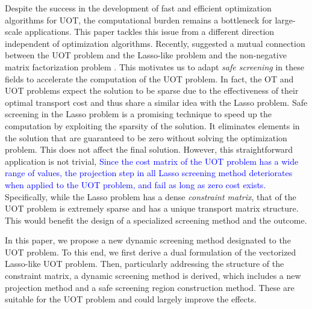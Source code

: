 \documentclass[twoside]{article}
\theoremstyle{plain}
\newcommand{\changeXS}[1]{\textcolor{blue}{#1}}
\begin{document}
Despite the success in the development of fast and efficient optimization algorithms for UOT, the computational burden remains a bottleneck for large-scale applications. This paper tackles this issue from a different direction independent of optimization algorithms. Recently, \cite{Chapel_NeurIPS_2021} suggested a mutual connection between the UOT problem and the Lasso-like problem \citep{Tibshirani_JRSS_1996,Efron_AM_2004} and the non-negative matrix factorization problem \citep{Lee_NIPS_2000}. This motivates us to adapt {\it safe screening} \citep{ghaoui2010safe} in these fields to accelerate the computation of the UOT problem. In fact, the OT and UOT problems expect the solution to be sparse due to the effectiveness of their optimal transport cost and thus share a similar idea with the Lasso problem.
Safe screening in the Lasso problem is a promising technique to speed up the computation by exploiting the sparsity of the solution. It eliminates elements in the solution that are guaranteed to be zero without solving the optimization problem. This does not affect the final solution. However, this straightforward application is not trivial, \changeXS{Since the cost matrix of the UOT problem has a wide range of values, the projection step in all Lasso screening method deteriorates when applied to the UOT problem, and fail as long as zero cost exists.}\\
Specifically, while the Lasso problem has a dense {\it constraint matrix}, that of the UOT problem is extremely sparse and has a unique transport matrix structure. This would benefit the design of a specialized screening method and the outcome.
%


In this paper, we propose a new dynamic screening method designated to the UOT problem. To this end, we first derive a dual formulation of the vectorized Lasso-like UOT problem. Then, particularly addressing the structure of the constraint matrix, a dynamic screening method is derived, which includes a new projection method and a safe screening region construction method. These are suitable for the UOT problem and could largely improve the effects. %
\end{document}
